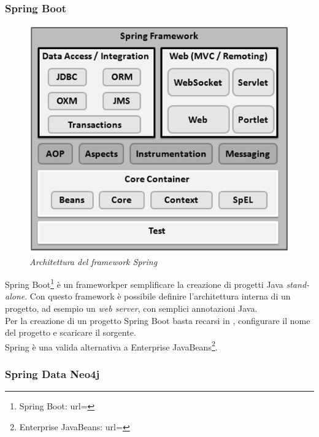 \subsubsection{Spring Boot}
\begin{figure}[h!]
	\centering
	\includegraphics[scale=0.45]{immagini/spring.png}
	\caption{\textit{Architettura del framework Spring} }
\end{figure}
Spring Boot\footnote{Spring Boot: url= } è un framework\glsfirstoccur per semplificare la creazione di progetti Java \textit{stand-alone}. Con questo framework è possibile definire l'architettura interna di un progetto, ad esempio un \textit{web server}, con semplici annotazioni Java.\\
Per la creazione di un progetto Spring Boot basta recarsi in , configurare il nome del progetto e scaricare il sorgente.\\
Spring è una valida alternativa a Enterprise JavaBeans\footnote{Enterprise JavaBeans: url= }.

\subsubsection{Spring Data Neo4j}

